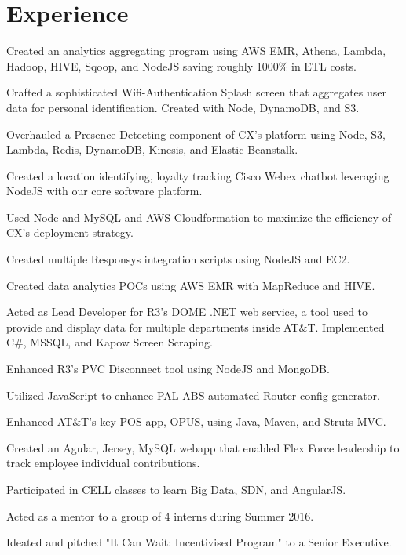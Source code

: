 \documentclass[]{deedy-resume-openfont}
\begin{document}
\begin{minipage}[t]{0.66\textwidth} 


\section{Experience}

\vspace{\topsep} %
\begin{tightemize}
\item Created an analytics aggregating program using AWS EMR, Athena, Lambda, Hadoop, HIVE, Sqoop, and NodeJS  saving roughly 1000\% in ETL costs.
\item Crafted a sophisticated Wifi-Authentication Splash screen that aggregates user data for personal identification. Created with Node, DynamoDB, and S3.
\item Overhauled a Presence Detecting component of CX's platform using Node, S3, Lambda, Redis, DynamoDB, Kinesis, and Elastic Beanstalk.
\item Created a location identifying, loyalty tracking Cisco Webex chatbot leveraging NodeJS with our core software platform.
\item Used Node and MySQL and AWS Cloudformation to maximize the efficiency of CX's deployment strategy.
\item Created multiple Responsys integration scripts using NodeJS and EC2.
\item Created data analytics POCs using AWS EMR with MapReduce and HIVE.
\end{tightemize}
\sectionsep

\begin{tightemize}
\item Acted as Lead Developer for R3’s DOME .NET web service, a tool used to provide and display data for multiple departments inside AT\&T. Implemented C\#, MSSQL, and Kapow Screen Scraping.
\item Enhanced R3's PVC Disconnect tool using NodeJS and MongoDB.
\item Utilized JavaScript to enhance PAL-ABS automated Router config generator.
\item Enhanced AT\&T's key POS app, OPUS, using Java, Maven, and Struts MVC.
\item Created an Agular, Jersey, MySQL webapp that enabled Flex Force leadership to track employee individual contributions.
\item Participated in CELL classes to learn Big Data, SDN, and AngularJS.
\item Acted as a mentor to a group of 4 interns during Summer 2016.
\item Ideated and pitched "It Can Wait: Incentivised Program" to a Senior Executive.
\end{tightemize}
\sectionsep


\end{minipage}
\end{document}
